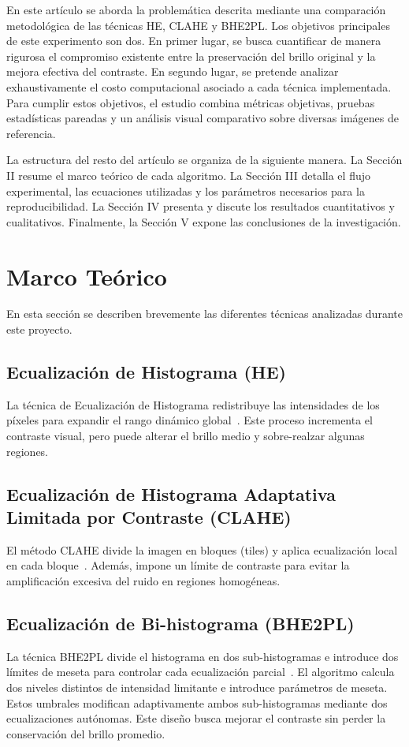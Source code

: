 \documentclass[journal,10pt,twocolumn]{IEEEtran}
\begin{document}
En este artículo se aborda la problemática descrita mediante una comparación metodológica de las técnicas HE, CLAHE y BHE2PL. Los objetivos principales de este experimento son dos. En primer lugar, se busca cuantificar de manera rigurosa el compromiso existente entre la preservación del brillo original y la mejora efectiva del contraste. En segundo lugar, se pretende analizar exhaustivamente el costo computacional asociado a cada técnica implementada. Para cumplir estos objetivos, el estudio combina métricas objetivas, pruebas estadísticas pareadas y un análisis visual comparativo sobre diversas imágenes de referencia.

La estructura del resto del artículo se organiza de la siguiente manera. La Sección II resume el marco teórico de cada algoritmo. La Sección III detalla el flujo experimental, las ecuaciones utilizadas y los parámetros necesarios para la reproducibilidad. La Sección IV presenta y discute los resultados cuantitativos y cualitativos. Finalmente, la Sección V expone las conclusiones de la investigación.

\section{Marco Teórico}
En esta sección se describen brevemente las diferentes técnicas analizadas durante este proyecto.

\subsection{Ecualización de Histograma (HE)}
La técnica de Ecualización de Histograma redistribuye las intensidades de los píxeles para expandir el rango dinámico global~\cite{gonzalez2008digital}. Este proceso incrementa el contraste visual, pero puede alterar el brillo medio y sobre-realzar algunas regiones.

\subsection{Ecualización de Histograma Adaptativa Limitada por Contraste (CLAHE)}
El método CLAHE divide la imagen en bloques (tiles) y aplica ecualización local en cada bloque~\cite{zuiderveld1994contrast}. Además, impone un límite de contraste para evitar la amplificación excesiva del ruido en regiones homogéneas.

\subsection{Ecualización de Bi-histograma (BHE2PL)}
La técnica BHE2PL divide el histograma en dos sub-histogramas e introduce dos límites de meseta para controlar cada ecualización parcial~\cite{aquino2017bi}. El algoritmo calcula dos niveles distintos de intensidad limitante e introduce parámetros de meseta. Estos umbrales modifican adaptivamente ambos sub-histogramas mediante dos ecualizaciones autónomas. Este diseño busca mejorar el contraste sin perder la conservación del brillo promedio.
\end{document}
